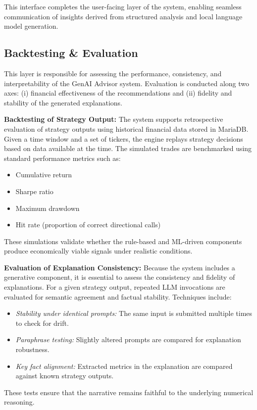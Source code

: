 This interface completes the user-facing layer of the system, enabling seamless communication of insights derived from structured analysis and local language model generation.

\subsection{Backtesting \& Evaluation}

This layer is responsible for assessing the performance, consistency, and interpretability of the GenAI Advisor system. Evaluation is conducted along two axes: (i) financial effectiveness of the recommendations and (ii) fidelity and stability of the generated explanations.

\textbf{Backtesting of Strategy Output:} The system supports retrospective evaluation of strategy outputs using historical financial data stored in MariaDB. Given a time window and a set of tickers, the engine replays strategy decisions based on data available at the time. The simulated trades are benchmarked using standard performance metrics such as:
\begin{itemize}
    \item Cumulative return
    \item Sharpe ratio
    \item Maximum drawdown
    \item Hit rate (proportion of correct directional calls)
\end{itemize}
These simulations validate whether the rule-based and ML-driven components produce economically viable signals under realistic conditions.

\textbf{Evaluation of Explanation Consistency:} Because the system includes a generative component, it is essential to assess the consistency and fidelity of explanations. For a given strategy output, repeated LLM invocations are evaluated for semantic agreement and factual stability. Techniques include:
\begin{itemize}
    \item \emph{Stability under identical prompts:} The same input is submitted multiple times to check for drift.
    \item \emph{Paraphrase testing:} Slightly altered prompts are compared for explanation robustness.
    \item \emph{Key fact alignment:} Extracted metrics in the explanation are compared against known strategy outputs.
\end{itemize}
These tests ensure that the narrative remains faithful to the underlying numerical reasoning.

